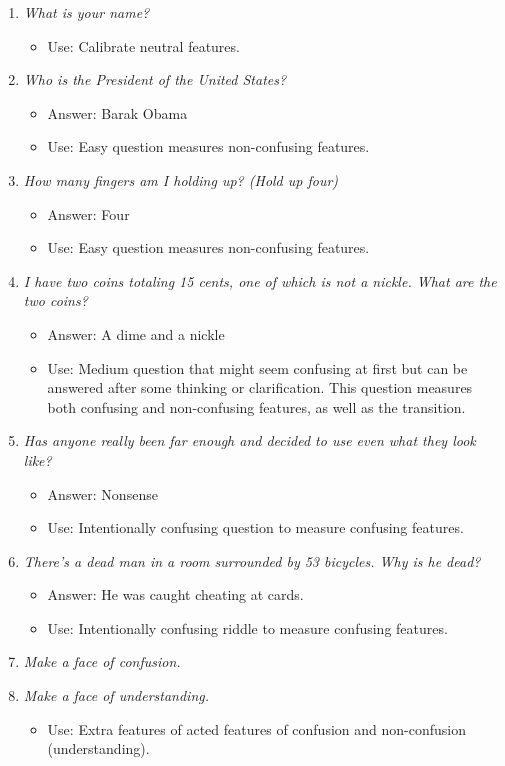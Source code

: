 \documentclass[12pt,letterpaper]{article}
\begin{document}
\begin{enumerate}
\item \emph{What is your name?}
\begin{itemize}
\item Use: Calibrate neutral features. 
\end{itemize}
 
\item \emph{Who is the President of the United States?}
\begin{itemize}
\item Answer: Barak Obama
\item Use: Easy question measures non-confusing features. 
\end{itemize}

\item \emph{How many fingers am I holding up? (Hold up four)}
\begin{itemize}
\item Answer: Four
\item Use: Easy question measures non-confusing features. 
\end{itemize}

\item \emph{I have two coins totaling 15 cents, one of which is not a nickle. What are the two coins?}
\begin{itemize}
\item Answer: A dime and a nickle
\item Use: Medium question that might seem confusing at first but can be answered after some thinking or clarification. This question measures both confusing and non-confusing features, as well as the transition.
\end{itemize}

\item \emph{Has anyone really been far enough and decided to use even what they look like?}
\begin{itemize}
\item Answer: Nonsense
\item Use: Intentionally confusing question to measure confusing features.
\end{itemize}

\item \emph{There’s a dead man in a room surrounded by 53 bicycles. Why is he dead?}
\begin{itemize}
\item Answer: He was caught cheating at cards.
\item Use: Intentionally confusing riddle to measure confusing features.
\end{itemize}

\item \emph{Make a face of confusion.}
\item \emph{Make a face of understanding.}
\begin{itemize}
\item Use: Extra features of acted features of confusion and non-confusion (understanding). 
\end{itemize}
\end{enumerate}
\end{document}
